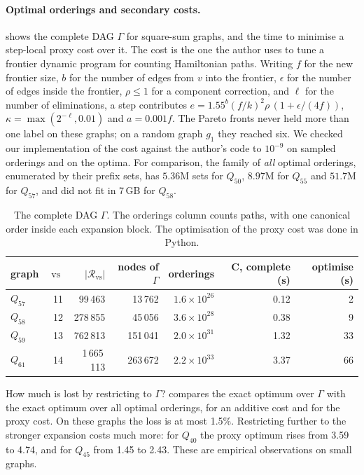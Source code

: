 \documentclass[11pt]{article}
\theoremstyle{definition}
\newcommand{\vs}{\operatorname{vs}}
\newcommand{\Rel}{\mathcal{R}}
\begin{document}
\paragraph{Optimal orderings and secondary costs.}
 shows the complete DAG $\Gamma$ for square-sum graphs, and
the time to minimise a step-local proxy cost over it. The cost is the one
the author uses to tune a frontier dynamic program for counting Hamiltonian
paths. Writing $f$ for the new frontier size, $b$ for the number of edges
from $v$ into the frontier, $\epsilon$ for the number of edges inside the
frontier, $\rho\le1$ for a component correction, and $\ell$ for the number of
eliminations, a step contributes
$e=1.55^{b}(f/k)^2\rho\,(1+\epsilon/(4f))$,
$\kappa=\max(2^{-\ell},0.01)$ and $a=0.001f$. The Pareto fronts never held
more than one label on these graphs; on a random graph $g_1$ they reached
six. We checked our implementation of the cost against the author's code to
$10^{-9}$ on sampled orderings and on the optima. For comparison, the family
of \emph{all} optimal orderings, enumerated by their prefix sets, has
$5.36$M sets for $Q_{50}$, $8.97$M for $Q_{55}$ and $51.7$M for $Q_{57}$, and
did not fit in 7\,GB for $Q_{58}$.

\begin{table}[ht]
\centering
\small
\begin{tabular}{lrrrrrr}
\toprule
graph & $\vs$ & $|\Rel_{\vs}|$ & nodes of $\Gamma$ & orderings & C, complete (s) & optimise (s)\\
\midrule
$Q_{57}$ & 11 & 99\,463 & 13\,762 & $1.6\times10^{26}$ & 0.12 & 2\\
$Q_{58}$ & 12 & 278\,855 & 45\,056 & $3.6\times10^{28}$ & 0.38 & 9\\
$Q_{59}$ & 13 & 762\,813 & 151\,041 & $2.0\times10^{31}$ & 1.32 & 33\\
$Q_{61}$ & 14 & 1\,665\,113 & 263\,672 & $2.2\times10^{33}$ & 3.37 & 66\\
\bottomrule
\end{tabular}
\caption{The complete DAG $\Gamma$. The orderings column counts paths, with
one canonical order inside each expansion block. The optimisation of the
proxy cost was done in Python.}\label{tab:orders}
\end{table}

How much is lost by restricting to $\Gamma$?  compares
the exact optimum over $\Gamma$ with the exact optimum over all optimal
orderings, for an additive cost and for the proxy cost. On these graphs the
loss is at most 1.5\%. Restricting further to the stronger expansion costs
much more: for $Q_{40}$ the proxy optimum rises from 3.59 to 4.74, and for
$Q_{45}$ from 1.45 to 2.43. These are empirical observations on small
graphs.
\end{document}

